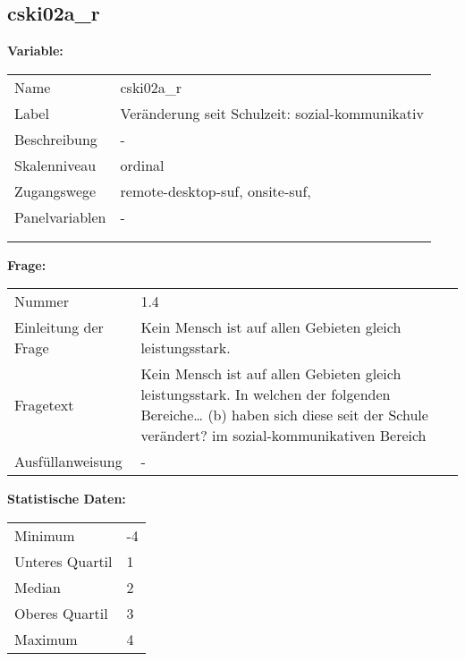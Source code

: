 	
	
	\subsection{cski02a\_r}
	\label{subSection:cski02a_r}

	\noindent\textbf{Variable:}\\
		\begin{tabular}{lL{11.3cm}}
			\label{tableVariable:cski02a_r}
			Name & cski02a\_r \\
			Label & Veränderung seit Schulzeit: sozial-kommunikativ \\
			Beschreibung & - \\
			Skalenniveau & ordinal \\
			Zugangswege &
				remote-desktop-suf,
				onsite-suf,
 \\
			Panelvariablen & -
			 \\
			 \\
 \\
		\end{tabular}

		\vspace*{1 cm}
		\noindent\textbf{Frage:}\\
		\begin{tabular}{lL{11.3cm}}
			\label{tableQuestion:cski02a_r}
			Nummer & 1.4 \\
			Einleitung der Frage & Kein Mensch ist auf allen Gebieten gleich leistungsstark. \\
			Fragetext & Kein Mensch ist auf allen Gebieten gleich leistungsstark. In welchen der folgenden Bereiche…
(b) haben sich diese seit der Schule verändert?
im sozial-kommunikativen Bereich \\
			Ausfüllanweisung & - \\
		\end{tabular}


		\vspace*{1 cm}
		\noindent\textbf{Statistische Daten:}\\
			\begin{tabular}{ll}
				\label{tableStatistics:cski02a_r}
					Minimum & -4 \\
					Unteres Quartil & 1 \\
					Median & 2 \\
					Oberes Quartil & 3 \\
					Maximum & 4 \\
			\end{tabular}



